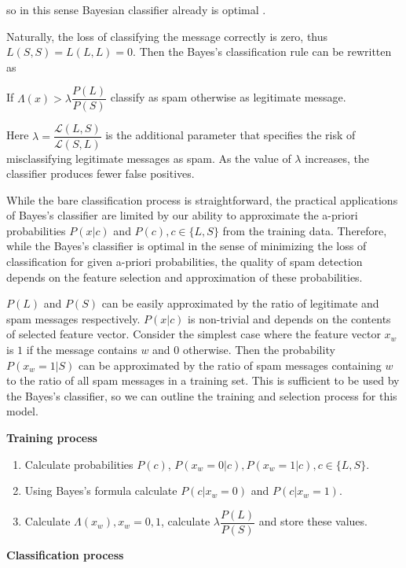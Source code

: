 \documentclass[12pt]{report}
\newcommand{\Loss}{\mathcal{L}}
\begin{document}
so in this sense Bayesian classifier already is optimal \cite{Tretyakov}.

Naturally, the loss of classifying the message correctly is zero, thus $L(S, S) = L(L, L) = 0$. Then the Bayes's classification rule can be rewritten as

\begin{center}
	If $\Lambda(x) > \lambda \dfrac{P(L)}{P(S)}$ classify as spam otherwise as legitimate message.
\end{center}

Here $\lambda = \dfrac{\Loss(L, S)}{\Loss(S, L)}$ is the additional parameter that specifies the risk of misclassifying legitimate messages as spam. As the value of $\lambda$ increases, the classifier produces fewer false positives.

While the bare classification process is straightforward, the practical applications of Bayes's classifier are limited by our ability to approximate the a-priori probabilities $P(x | c)$ and $P(c), c \in \{L, S\}$ from the training data. Therefore, while the Bayes's classifier is optimal in the sense of minimizing the loss of classification for given a-priori probabilities, the quality of spam detection depends on the feature selection and approximation of these probabilities.

$P(L)$ and $P(S)$ can be easily approximated by the ratio of legitimate and spam messages respectively. $P(x | c)$ is non-trivial and depends on the contents of selected feature vector. Consider the simplest case where the feature vector $x_w$ is $1$ if the message contains $w$ and $0$ otherwise. Then the probability $P(x_w = 1 | S)$ can be approximated by the ratio of spam messages containing $w$ to the ratio of all spam messages in a training set. This is sufficient to be used by the Bayes's classifier, so we can outline the training and selection process for this model.

\textbf{Training process}

\begin{enumerate}
	\item Calculate probabilities $P(c)$, $P(x_w = 0 | c), P(x_w = 1 | c), c \in \{L, S\}$.
	\item Using Bayes's formula calculate $P(c | x_w = 0)$ and $P(c | x_w = 1)$.
	\item Calculate $\Lambda(x_w), x_w = 0, 1$, calculate $\lambda \dfrac{P(L)}{P(S)}$ and store these values.
\end{enumerate}

\textbf{Classification process}
\end{document}
